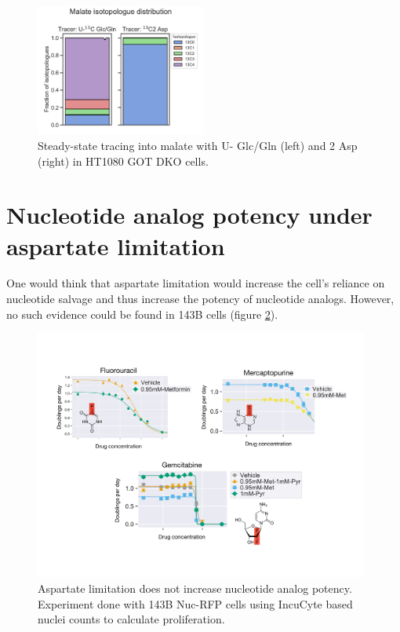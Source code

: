 \begin{figure}[ht]
    \centering
    \includegraphics[width=0.5\textwidth]{figures/sapp/DKO_char/HT1080_Mal_iso_dist.pdf}
    \caption[\hCi{} Gln/Glc, Asp tracing in HT1080 GOT DKO, Malate]{
    Steady-state tracing into malate with U-\hCi{} Glc/Gln (left) and \hCi{}2 Asp (right) in HT1080 GOT DKO cells.
    }
    \label{fig:sapp:DKO_char:HT1080_Mal_iso_dist}
\end{figure}




\FloatBarrier
\section{Nucleotide analog potency under aspartate limitation}
One would think that aspartate limitation would increase the cell's reliance on nucleotide salvage and thus increase the potency of nucleotide analogs.
However, no such evidence could be found in 143B cells (figure \ref{fig:sapp:random:nucleotide_analogs}).

\begin{figure}[ht]
    \centering
    \includegraphics[width=0.98\textwidth]{figures/sapp/random/nucleotide_analogs.pdf}
    \caption[Asp limitation does not increase nucleotide analog potency.]{
    Aspartate limitation does not increase nucleotide analog potency.
    Experiment done with 143B Nuc-RFP cells using IncuCyte based nuclei counts to calculate proliferation.
    }
    \label{fig:sapp:random:nucleotide_analogs}
\end{figure}




